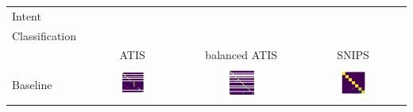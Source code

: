 \documentclass[a4paper]{article}
\begin{document}
\begin{table}[h]
	\centering
	\begin{adjustbox}{max width=\textwidth}
		\begin{tabular}{l|ccc}
			Intent & & & \\
			Classification & & & \\
			& ATIS & balanced ATIS & SNIPS \\
			\cmidrule{1-4}
			Baseline &  \includegraphics[width=0.3\textwidth]{../assets/CM_baseline_intent_ATIS_labeless} & \includegraphics[width=0.3\textwidth]{../assets/CM_baseline_intent_remix_ATIS_labeless} &\includegraphics[width=0.3\textwidth]{../assets/CM_baseline_intent_SNIPS_labeless} \\
			\cmidrule{1-4}

\end{tabular}
\end{adjustbox}
\end{table}
\end{document}
